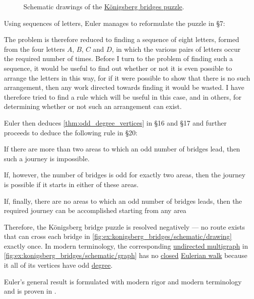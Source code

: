 \begin{example}
\begin{figure}[ht!]
    \caption{Schematic drawings of the \hyperref[ex:konigsberg_bridges]{K\"onigsberg bridges puzzle}.}\label{fig:ex:konigsberg_bridges/schematic}
  \end{figure}

  Using sequences of letters, Euler manages to reformulate the puzzle in \S 7:
  \begin{displayquote}
    The problem is therefore reduced to finding a sequence of eight letters, formed from the four letters \( A \), \( B \), \( C \) and \( D \), in which the various pairs of letters occur the required number of times. Before I turn to the problem of finding such a sequence, it would be useful to find out whether or not it is even possible to arrange the letters in this way, for if it were possible to show that there is no such arrangement, then any work directed towards finding it would be wasted. I have therefore tried to find a rule which will be useful in this case, and in others, for determining whether or not such an arrangement can exist.
  \end{displayquote}

  Euler then deduces \cref{thm:odd_degree_vertices} in \S 16 and \S 17 and further proceeds to deduce the following rule in \S 20:
  \begin{displayquote}
    If there are more than two areas to which an odd number of bridges lead, then such a journey is impossible.

    If, however, the number of bridges is odd for exactly two areas, then the journey is possible if it starts in either of these areas.

    If, finally, there are no areas to which an odd number of bridges leads, then the required journey can be accomplished starting from any area
  \end{displayquote}

  Therefore, the K\"onigsberg bridge puzzle is resolved negatively --- no route exists that can cross each bridge in \cref{fig:ex:konigsberg_bridges/schematic/drawing} exactly once. In modern terminology, the corresponding \hyperref[def:hypergraph/multigraph]{undirected multigraph} in \cref{fig:ex:konigsberg_bridges/schematic/graph} has no \hyperref[def:graph_walk/closed]{closed} \hyperref[def:eulerian_walk]{Eulerian walk} because it all of its vertices have odd \hyperref[def:graph_cardinality/undirected_degree]{degree}.

  Euler's general result is formulated with modern rigor and modern terminology and is proven in .
\end{example}
